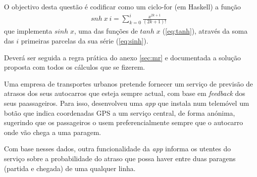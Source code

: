 \documentclass[11pt, a4paper, fleqn]{article}
\newcommand{\Varid}[1]{\mathit{#1}}
\begin{document}
O objectivo desta questão é codificar como um ciclo-\textsf{for} (em Haskell) a função
\begin{eqnarray}
	snh\ x\ i = \sum_{k=0}^i \frac{x^{2k+1}}{(2k+1)!}
\end{eqnarray}
que implementa \ensuremath{\Varid{sinh}\;\Varid{x}}, uma das funções de \ensuremath{\Varid{tanh}\;\Varid{x}} (\ref{eq:tanh}), através
da soma das \ensuremath{\Varid{i}} primeiras parcelas da sua série (\ref{eq:sinh}).

Deverá ser seguida a regra prática do anexo \ref{sec:mr} e documentada a
solução proposta com todos os cálculos que se fizerem.

\Problema

Uma empresa de transportes urbanos pretende fornecer um serviço de previsão
de atrasos dos seus autocarros que esteja sempre actual, com base em \emph{feedback}
dos seus paassageiros. Para isso, desenvolveu uma \emph{app} que instala
num telemóvel um botão que indica coordenadas GPS a um serviço central, de
forma anónima, sugerindo que os passageiros o usem preferencialmente sempre
que o autocarro onde vão chega a uma paragem.

Com base nesses dados, outra funcionalidade da \emph{app} informa os utentes
do serviço sobre a probabilidade do atraso que possa haver entre duas paragens
(partida e chegada) de uma qualquer linha.
\end{document}
